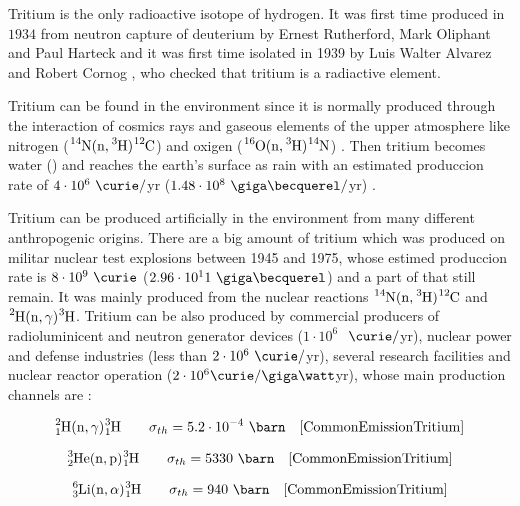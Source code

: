 Tritium is the only radioactive isotope of hydrogen. It was first time produced in $1934$ from neutron capture of deuterium by Ernest Rutherford, Mark Oliphant and Paul Harteck \cite{TritiumDiscovery} and it was first time isolated in 1939 by Luis Walter Alvarez and Robert Cornog \cite{TritiumIsolate}, who checked that tritium is a radiactive element. 

Tritium can be found in the environment since it is normally produced through the interaction of cosmics rays and gaseous elements of the upper atmosphere like nitrogen ($\ce{^{14}N}(\ce{n},\ce{^{3}H})\ce{^{12}C}$) \cite{TritiumHandling} and oxigen ($\ce{^{16}O}(\ce{n},\ce{^{3}H})\ce{^{14}N}$) \cite{OxigenTritium}. Then tritium becomes water () and reaches the earth's surface as rain with an estimated produccion rate of $4\cdot 10^6 ~\curie/$yr \newline ($1.48 \cdot 10^8 ~\giga\becquerel/$yr) \cite{CommonEmissionTritium} \cite{TritiumHandling} . 

Tritium can be produced artificially in the environment from many different anthropogenic origins. There are a big amount of tritium which was produced on militar nuclear test explosions between 1945 and 1975, whose estimed produccion rate is $8 \cdot 10^9~\curie$ ($2.96 \cdot 10^11~\giga\becquerel$) and a part of that still remain. It was mainly produced from the nuclear reactions $\ce{^{14}N}(\ce{n},\ce{^{3}H})\ce{^{12}C}$ and $\ce{^{2}H}(\ce{n},\gamma)\ce{^{3}H}$. Tritium can be also produced by commercial producers of radioluminicent and neutron generator devices ($1 \cdot 10^6$ $~\curie/$yr), nuclear power and defense industries (less than $2 \cdot 10^6~\curie/$yr), several research facilities and nuclear reactor operation ($2 \cdot 10^6 \curie/\giga\watt$yr), whose main production channels are \cite{CommonEmissionTritium} \cite{TritiumHandling}:

\begin{equation}
\ce{^{2}_{1}H}(\ce{n},\gamma)\ce{^{3}_{1}H} \qquad \sigma_{th}= 5.2 \cdot{} 10^{-4}~\barn  ~~~\cite{CommonEmissionTritium}
\label{capneuH2}
\end{equation}

\begin{equation}
\ce{^{3}_{2}He}(\ce{n},\ce{p})\ce{^{3}_{1}H} \qquad \sigma_{th}= 5330~\barn ~~~\cite{CommonEmissionTritium}
\label{capneuHe3}
\end{equation}

\begin{equation}
\ce{^{6}_{3}Li}(\ce{n},\alpha)\ce{^{3}_{1}H} \qquad \sigma_{th}= 940~\barn ~~~\cite{CommonEmissionTritium}
\label{capneuLi6}
\end{equation}

